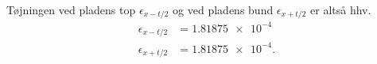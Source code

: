 \begin{finalresult}
  Tøjningen ved pladens top $\epsilon_{x - t / 2}$ og ved pladens bund $\epsilon_{x + t / 2}$ er altså hhv.
  \begin{align*}
    \epsilon_{x - t / 2} &= \num{1,81875e-4}  \\
    \epsilon_{x + t / 2} &= \num{1,81875e-4} 
  .\end{align*}
\end{finalresult}
